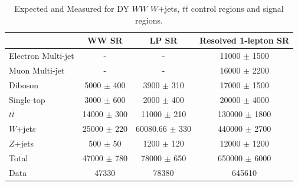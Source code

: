 \begin{table}
\begin{tabular}{|l|c|c|c|}
\hline
	  &	 WW SR &	 LP SR &	Resolved 1-lepton SR \\\hline 
	Electron Multi-jet &	- &	- &	11000 $\pm$ 1500 \\\hline 
	Muon Multi-jet &	- &	- &	16000 $\pm$ 2200 \\\hline 
	Diboson &	5000 $\pm$ 400 &	3900 $\pm$ 310 &	17000 $\pm$ 1500 \\\hline 
	Single-top &	3000 $\pm$ 600 &	2000 $\pm$ 400 &	20000 $\pm$ 4000 \\\hline 
	$t\bar{t}$ &	14000 $\pm$ 300 &	11000 $\pm$ 210&	130000 $\pm$ 1800 \\\hline 
	$W$+jets &	25000 $\pm$ 220 &	60080.66 $\pm$ 330 &	440000 $\pm$ 2700 \\\hline 
	$Z$+jets &	500 $\pm$ 50 &	1200 $\pm$ 120 &	12000 $\pm$ 1200 \\\hline 
	Total &	47000 $\pm$ 780 &	78000 $\pm$ 650 &	650000 $\pm$ 6000 \\\hline 
	Data &	47330 &	78380 &	645610 \\\hline 
\end{tabular}
\caption{Expected and Measured for DY $WW$ $W$+jets, $t\bar{t}$ control regions and signal regions.}
\label{tbl:hvtww_yields}
\end{table}


